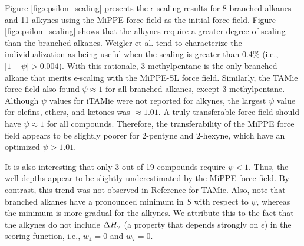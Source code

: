 \documentclass[journal=jced,manuscript=article]{achemso}
\begin{document}

Figure \ref{fig:epsilon_scaling} presents the $\epsilon$-scaling results for 8 branched alkanes and 11 alkynes using the MiPPE force field as the initial force field. Figure \ref{fig:epsilon_scaling} shows that the alkynes require a greater degree of scaling than the branched alkanes. Weigler et al. tend to characterize the individualization as being useful when the scaling is greater than 0.4\% (i.e., $|1 - \psi| > 0.004$). With this rationale, 3-methylpentane is the only branched alkane that merits $\epsilon$-scaling with the MiPPE-SL force field. Similarly, the TAMie force field also found $\psi \approx 1$ for all branched alkanes, except 3-methylpentane. Although $\psi$ values for iTAMie were not reported for alkynes, the largest $\psi$ value for olefins, ethers, and ketones was $\approx 1.01$. A truly transferable force field should have $\psi \approx 1$ for all compounds. Therefore, the transferability of the MiPPE force field appears to be slightly poorer for 2-pentyne and 2-hexyne, which have an optimized $\psi > 1.01$. 

It is also interesting that only 3 out of 19 compounds require $\psi < 1$. Thus, the well-depths appear to be slightly underestimated by the MiPPE force field. By contrast, this trend was not observed in Reference  for TAMie. Also, note that branched alkanes have a pronounced minimum in $S$ with respect to $\psi$, whereas the minimum is more gradual for the alkynes. We attribute this to the fact that the alkynes do not include $\Delta H_{\rm v}$ (a property that depends strongly on $\epsilon$) in the scoring function, i.e., $w_4 = 0$ and $w_7 = 0$. 

\end{document}
